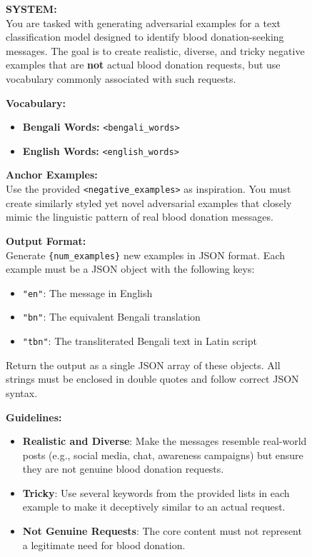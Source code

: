 \documentclass[11pt]{article}
\begin{document}
\begin{figure}[t]
\centering
\begin{tcolorbox}[title=\textbf{Few-shot Prompt Template for Adversarial Negative Sample Generation}, width=0.95\textwidth, colback=white]
\textbf{SYSTEM:} \\
You are tasked with generating adversarial examples for a text classification model designed to identify blood donation-seeking messages. The goal is to create realistic, diverse, and tricky negative examples that are \textbf{not} actual blood donation requests, but use vocabulary commonly associated with such requests.

\textbf{Vocabulary:}
\begin{itemize}
    \item \textbf{Bengali Words:} \texttt{<bengali\_words>}
    \item \textbf{English Words:} \texttt{<english\_words>}
\end{itemize}

\textbf{Anchor Examples:} \\
Use the provided \texttt{<negative\_examples>} as inspiration. You must create similarly styled yet novel adversarial examples that closely mimic the linguistic pattern of real blood donation messages.

\textbf{Output Format:} \\
Generate \texttt{\{num\_examples\}} new examples in JSON format. Each example must be a JSON object with the following keys:
\begin{itemize}
    \item \texttt{"en"}: The message in English
    \item \texttt{"bn"}: The equivalent Bengali translation
    \item \texttt{"tbn"}: The transliterated Bengali text in Latin script
\end{itemize}
Return the output as a single JSON array of these objects. All strings must be enclosed in double quotes and follow correct JSON syntax.

\textbf{Guidelines:}
\begin{itemize}
    \item \textbf{Realistic and Diverse}: Make the messages resemble real-world posts (e.g., social media, chat, awareness campaigns) but ensure they are not genuine blood donation requests.
    \item \textbf{Tricky}: Use several keywords from the provided lists in each example to make it deceptively similar to an actual request.
    \item \textbf{Not Genuine Requests}: The core content must not represent a legitimate need for blood donation.
\end{itemize}


\end{tcolorbox}
\end{figure}
\end{document}
